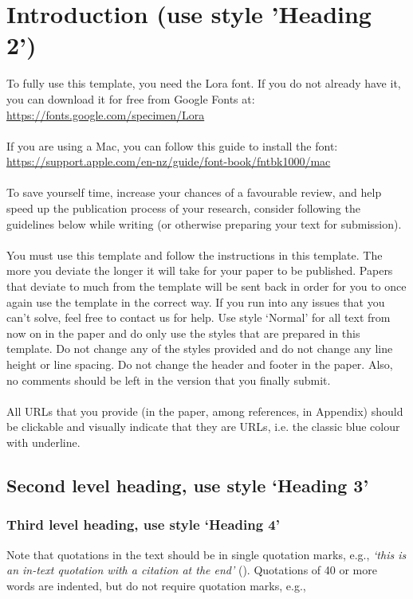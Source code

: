 \documentclass[12pt]{article}
\begin{document}
\section{Introduction (use style 'Heading 2')}
To fully use this template, you need the Lora font.  If you do not already have it, you can download it for free from Google Fonts at: \url{https://fonts.google.com/specimen/Lora }\\\\
If you are using a Mac, you can follow this guide to install the font: \url{https://support.apple.com/en-nz/guide/font-book/fntbk1000/mac}\\\\
To save yourself time, increase your chances of a favourable review, and help speed up the publication process of your research, consider following the guidelines below while writing (or otherwise preparing your text for submission).\\\\
You must use this template and follow the instructions in this template. The more you deviate the longer it will take for your paper to be published. Papers that deviate to much from the template will be sent back in order for you to once again use the template in the correct way. If you run into any issues that you can’t solve, feel free to contact us for help.
Use style ‘Normal’ for all text from now on in the paper and do only use the styles that are prepared in this template. Do not change any of the styles provided and do not change any line height or line spacing. Do not change the header and footer in the paper. Also, no comments should be left in the version that you finally submit.\\\\
All URLs that you provide (in the paper, among references, in Appendix) should be clickable and visually indicate that they are URLs, i.e. the classic blue colour with underline.


\subsection{Second level heading, use style ‘Heading 3’}
\subsubsection{Third level heading, use style ‘Heading 4’}

Note that quotations in the text should be in single quotation marks, e.g., \emph{‘this is an in-text quotation with a citation at the end’} (\cite{andronico2006blind}).  Quotations of 40 or more words are indented, but do not require quotation marks, e.g.,
\end{document}
